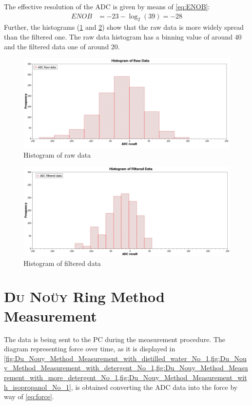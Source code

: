         The effective resolution of the ADC is given by means of \cref{eq:ENOB}:
        \begin{align*}
            ENOB&=-23-\log_2(39)=-28
        \end{align*}
        Further, the histograms (\cref{fig:histogram_raw_data} and \cref{fig:histogram_filtered_data}) show that the raw
        data is more widely spread than the filtered one. The raw data histogram has a binning value of around 40 and the
        filtered data one of around 20.
        \begin{figure}[H]
            \centering
            \includegraphics[width=.9\textwidth]{scidavis/histogram_raw_data.jpg}
            \caption[Histogram of raw data]{Histogram of raw data}
            \label{fig:histogram_raw_data}
        \end{figure}
        \begin{figure}[H]
            \centering
            \includegraphics[width=.9\textwidth]{scidavis/histogram_filtered_data.jpg}
            \caption[Histogram of filtered data]{Histogram of filtered data}
            \label{fig:histogram_filtered_data}
        \end{figure}
    \section{\textsc{Du Noüy} Ring Method Measurement}
        The data is being sent to the PC during the measurement procedure. The diagram representing force over time, as it
        is displayed in \cref{fig:Du_Nouy_Method_Measurement_with_distilled_water_No_1,fig:Du_Nouy_Method_Measurement_with_detergent_No_1,fig:Du_Nouy_Method_Measurement_with_more_detergent_No_1,fig:Du_Nouy_Method_Measurement_with_isopropanol_No_1}, is obtained converting the ADC data into the force by way of \cref{eq:force}. 
